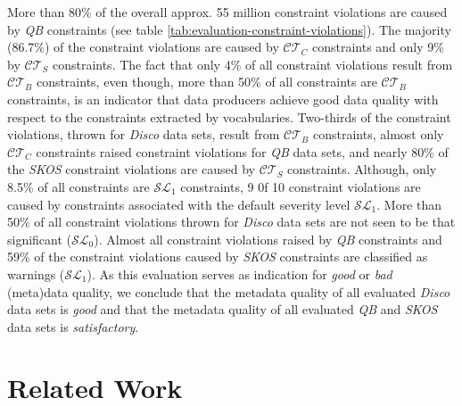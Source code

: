 \documentclass{llncs}
\begin{document}
{More than 80\% of the overall approx. 55 million constraint violations are caused by \emph{QB} constraints (see table \ref{tab:evaluation-constraint-violations}).
The majority (86.7\%) of the constraint violations are caused by $\mathcal{CT}_{C}$ constraints and only 9\% by $\mathcal{CT}_{S}$ constraints.
The fact that only 4\% of all constraint violations result from $\mathcal{CT}_{B}$ constraints, 
even though, more than 50\% of all constraints are $\mathcal{CT}_{B}$ constraints,
is an indicator that data producers achieve good data quality with respect to the constraints extracted by vocabularies.
Two-thirds of the constraint violations, thrown for \emph{Disco} data sets, result from $\mathcal{CT}_{B}$ constraints,
almost only $\mathcal{CT}_{C}$ constraints raised constraint violations for \emph{QB} data sets, and 
nearly 80\% of the \emph{SKOS} constraint violations are caused by $\mathcal{CT}_{S}$ constraints.
Although, only 8.5\% of all constraints are $\mathcal{SL}_{1}$ constraints,
9 0f 10 constraint violations are caused by constraints associated with the default severity level $\mathcal{SL}_{1}$.
More than 50\% of all constraint violations thrown for \emph{Disco} data sets are not seen to be that significant ($\mathcal{SL}_{0}$).
Almost all constraint violations raised by \emph{QB} constraints and 59\% of the constraint violations caused by \emph{SKOS} constraints are classified as warnings ($\mathcal{SL}_{1}$).  
As this evaluation serves as indication for \emph{good} or \emph{bad} (meta)data quality, 
we conclude that
the metadata quality of all evaluated \emph{Disco} data sets is \emph{good} and that the metadata quality of all evaluated \emph{QB} and \emph{SKOS} data sets is \emph{satisfactory}.

\section{Related Work}
\label{related-work}

}
\end{document}
